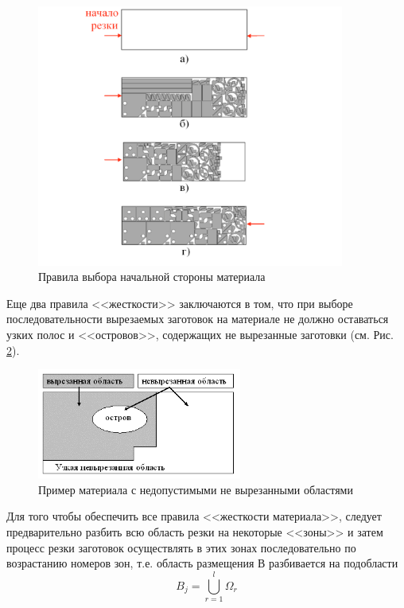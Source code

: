 \documentclass[11pt,twoside]{report}
\begin{document}
\begin{figure}
  \begin{center}
  \includegraphics[width=0.9\textwidth]{list-hardness.png}
  \caption{Правила выбора начальной стороны материала }
  \label{list-hardness}
  \end{center}
\end{figure}

Еще два правила <<жесткости>> заключаются в том,
что при выборе последовательности вырезаемых заготовок
на материале не должно оставаться узких полос и <<островов>>,
содержащих не вырезанные заготовки
(см. Рис. \ref{island}).

\begin{figure}
  \begin{center}
  \includegraphics[width=0.6\textwidth]{island.png}
  \caption{Пример материала с недопустимыми не вырезанными областями}
  \label{island}
  \end{center}
\end{figure}

Для того чтобы обеспечить все правила <<жесткости материала>>,
следует предварительно разбить всю область резки на некоторые <<зоны>>
и затем процесс резки заготовок осуществлять
в этих зонах последовательно по возрастанию номеров зон,
т.е. область размещения $В$ разбивается на подобласти
\begin{equation}
  B_j = \bigcup_{r=1}^l \Omega_r
\end{equation}
\end{document}

